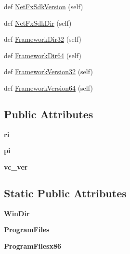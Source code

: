 \begin{DoxyCompactItemize}
\item 
def \hyperlink{classsetuptools_1_1msvc_1_1_system_info_a6d388097caf3354628b82893e620bf6f}{Net\+Fx\+Sdk\+Version} (self)
\item 
def \hyperlink{classsetuptools_1_1msvc_1_1_system_info_ad0fbcce4995153fab005f15910fb30a6}{Net\+Fx\+Sdk\+Dir} (self)
\item 
def \hyperlink{classsetuptools_1_1msvc_1_1_system_info_ac293ac926386145b04dfc6d9c2b5e2e3}{Framework\+Dir32} (self)
\item 
def \hyperlink{classsetuptools_1_1msvc_1_1_system_info_acaec285668f9b2ff4305aaeb660a620a}{Framework\+Dir64} (self)
\item 
def \hyperlink{classsetuptools_1_1msvc_1_1_system_info_aad4f31f62e06a1c6c02435a47a85bfff}{Framework\+Version32} (self)
\item 
def \hyperlink{classsetuptools_1_1msvc_1_1_system_info_abbe972ff9d7ca0369260a4266a1c4671}{Framework\+Version64} (self)
\end{DoxyCompactItemize}
\subsection*{Public Attributes}
\begin{DoxyCompactItemize}
\item 
\mbox{\label{classsetuptools_1_1msvc_1_1_system_info_ad6fde55784fa1753f5c8bee312e15afb}} 
{\bfseries ri}
\item 
\mbox{\label{classsetuptools_1_1msvc_1_1_system_info_aa52b1e157302254714cd63a2b53b2819}} 
{\bfseries pi}
\item 
\mbox{\label{classsetuptools_1_1msvc_1_1_system_info_aaf63b691809f5893000733170c79d98d}} 
{\bfseries vc\+\_\+ver}
\end{DoxyCompactItemize}
\subsection*{Static Public Attributes}
\begin{DoxyCompactItemize}
\item 
\mbox{\label{classsetuptools_1_1msvc_1_1_system_info_a25ba63d284f33a511bc4fe769d4ac319}} 
{\bfseries Win\+Dir}
\item 
\mbox{\label{classsetuptools_1_1msvc_1_1_system_info_ad0a2055f68b0ca75bec12eea447cfd47}} 
{\bfseries Program\+Files}
\item 
\mbox{\label{classsetuptools_1_1msvc_1_1_system_info_a7c6828f44a158ce0d0ab6f91127291ae}} 
{\bfseries Program\+Filesx86}
\end{DoxyCompactItemize}



